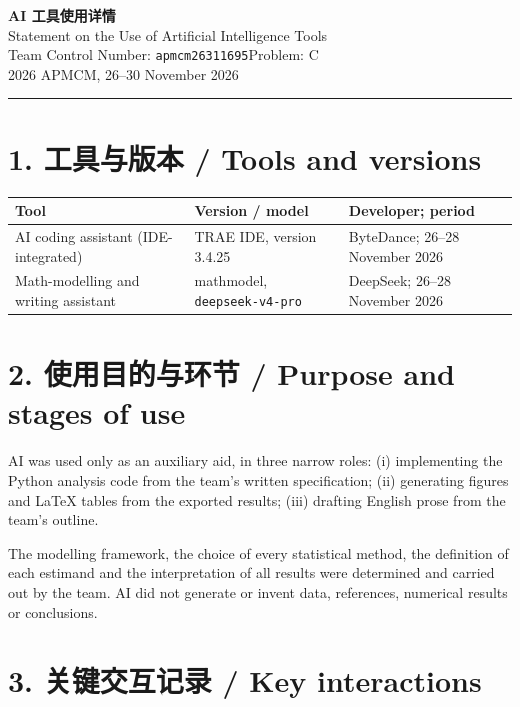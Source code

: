 \documentclass[11pt,a4paper]{article}
\begin{document}
\begin{CJK*}{UTF8}{gbsn}

\begin{center}
{\Large\bfseries AI 工具使用详情}\\[3pt]
{\large Statement on the Use of Artificial Intelligence Tools}\\[6pt]
Team Control Number: \texttt{apmcm26311695}\quad Problem: C\\
2026 APMCM, 26--30 November 2026
\end{center}

\noindent\rule{\textwidth}{0.4pt}

\section*{1. 工具与版本 / Tools and versions}

\begin{center}
\footnotesize
\begin{tabularx}{\textwidth}{@{}L{6.2cm}L{4.2cm}X@{}}
\toprule
Tool & Version / model & Developer; period \\
\midrule
AI coding assistant (IDE-integrated) & TRAE IDE, version 3.4.25 &
ByteDance; 26--28 November 2026 \\
Math-modelling and writing assistant & mathmodel, \texttt{deepseek-v4-pro} &
DeepSeek; 26--28 November 2026 \\
\bottomrule
\end{tabularx}
\end{center}

\section*{2. 使用目的与环节 / Purpose and stages of use}

AI was used only as an auxiliary aid, in three narrow roles: (i) implementing the Python
analysis code from the team's written specification; (ii) generating figures and \LaTeX{}
tables from the exported results; (iii) drafting English prose from the team's outline.

The modelling framework, the choice of every statistical method, the definition of each
estimand and the interpretation of all results were determined and carried out by the team.
AI did not generate or invent data, references, numerical results or conclusions.

\section*{3. 关键交互记录 / Key interactions}


\end{CJK*}
\end{document}
